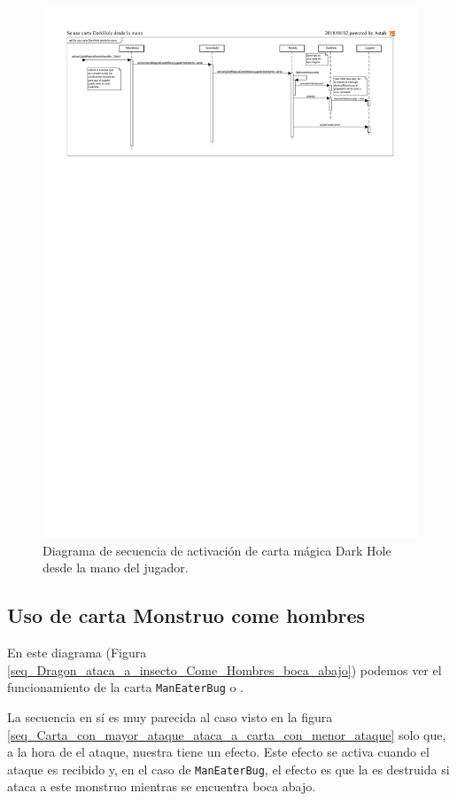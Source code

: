	\begin{figure}[H]
		\centering
		\includegraphics[scale=0.9]{includes/seq_DarkHole_desde_la_mano}
		\caption{Diagrama de secuencia de activación de carta mágica Dark Hole desde la mano del jugador.}
		\label{seq_DarkHole_desde_la_mano}
	\end{figure}
	
	\subsection{Uso de carta Monstruo come hombres}
	
	En este diagrama (Figura \ref{seq_Dragon_ataca_a_insecto_Come_Hombres_boca_abajo}) podemos ver el funcionamiento de la carta \texttt{ManEaterBug} o .
	
	La secuencia en sí es muy parecida al caso visto en la figura \ref{seq_Carta_con_mayor_ataque_ataca_a_carta_con_menor_ataque} solo que, a la hora de  el ataque, nuestra  tiene un efecto. Este efecto se activa cuando el ataque es recibido y, en el caso de \texttt{ManEaterBug}, el efecto es que la  es destruida si ataca a este monstruo mientras se encuentra boca abajo.
	
